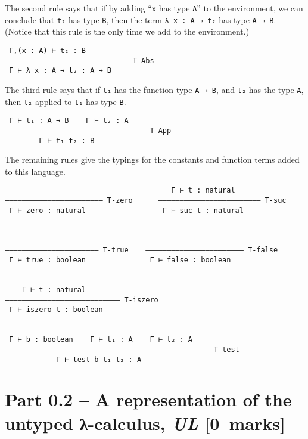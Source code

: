 \documentclass[11pt]{article}
\theoremstyle{definition}
\begin{document}
The second rule says that if by adding “\texttt{x} has type \texttt{A}” to the environment,
we can conclude that \texttt{t₂} has type \texttt{B}, then
the term \texttt{λ x : A → t₂} has type \texttt{A → B}.
(Notice that this rule is the only time we add to the environment.)
\begin{verbatim}
 Γ,(x : A) ⊢ t₂ : B
––––––––––––––––––––––––––––– T-Abs
 Γ ⊢ λ x : A → t₂ : A → B
\end{verbatim}

The third rule says that if \texttt{t₁} has the function type \texttt{A → B},
and \texttt{t₂} has the type \texttt{A}, then \texttt{t₂} applied to \texttt{t₁} has type \texttt{B}.
\begin{verbatim}
 Γ ⊢ t₁ : A → B    Γ ⊢ t₂ : A
––––––––––––––––––––––––––––––––– T-App
        Γ ⊢ t₁ t₂ : B
\end{verbatim}

The remaining rules give the typings for the constants and
function terms added to this language.
\begin{verbatim}
                                       Γ ⊢ t : natural
––––––––––––––––––––––– T-zero      –––––––––––––––––––––––– T-suc
 Γ ⊢ zero : natural                  Γ ⊢ suc t : natural
                            
                            
                            
–––––––––––––––––––––– T-true    ––––––––––––––––––––––– T-false
 Γ ⊢ true : boolean               Γ ⊢ false : boolean


    Γ ⊢ t : natural
––––––––––––––––––––––––––– T-iszero
 Γ ⊢ iszero t : boolean 


 Γ ⊢ b : boolean    Γ ⊢ t₁ : A    Γ ⊢ t₂ : A
–––––––––––––––––––––––––––––––––––––––––––––––– T-test
            Γ ⊢ test b t₁ t₂ : A
\end{verbatim}

\section*{Part 0.2 – A representation of the untyped λ-calculus, \emph{UL}    [0 marks]}
\label{sec:org0bea43c}
\end{document}

